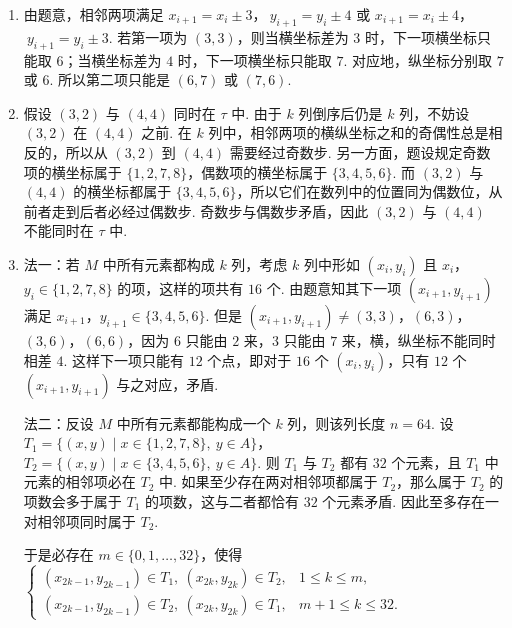 \documentclass[UTF8,a4paper,oneside,11pt]{ctexbook}
\begin{document}
\begin{solution}
\begin{enumerate}
\item 由题意，相邻两项满足
\(x_{i+1}=x_i\pm 3\)，\(\ y_{i+1}=y_i\pm 4\) 或 \(x_{i+1}=x_i\pm 4\)，\(\ y_{i+1}=y_i\pm 3\).
若第一项为 \((3,3)\)，则当横坐标差为 \(3\) 时，下一项横坐标只能取 \(6\)；当横坐标差为 \(4\) 时，下一项横坐标只能取 \(7\). 对应地，纵坐标分别取 \(7\) 或 \(6\). 所以第二项只能是
\((6,7)\) 或 \((7,6)\).

\item 假设 \((3,2)\) 与 \((4,4)\) 同时在 \(\tau\) 中. 由于 \(k\) 列倒序后仍是 \(k\) 列，不妨设 \((3,2)\) 在 \((4,4)\) 之前. 在 \(k\) 列中，相邻两项的横纵坐标之和的奇偶性总是相反的，所以从 \((3,2)\) 到 \((4,4)\) 需要经过奇数步. 另一方面，题设规定奇数项的横坐标属于 \(\{1,2,7,8\}\)，偶数项的横坐标属于 \(\{3,4,5,6\}\). 而 \((3,2)\) 与 \((4,4)\) 的横坐标都属于 \(\{3,4,5,6\}\)，所以它们在数列中的位置同为偶数位，从前者走到后者必经过偶数步. 奇数步与偶数步矛盾，因此 \((3,2)\) 与 \((4,4)\) 不能同时在 \(\tau\) 中.

\item 法一：若 \(M\) 中所有元素都构成 \(k\) 列，考虑 \(k\) 列中形如 \((x_i,y_i)\) 且 \(x_i\)，\(y_i\in\{1,2,7,8\}\) 的项，这样的项共有 \(16\) 个. 由题意知其下一项 \((x_{i+1},y_{i+1})\) 满足 \(x_{i+1}\)，\(y_{i+1}\in\{3,4,5,6\}\). 但是 \((x_{i+1},y_{i+1})\ne (3,3)\)，\((6,3)\)，\((3,6)\)，\((6,6)\)，因为 \(6\) 只能由 \(2\) 来，\(3\) 只能由 \(7\) 来，横，纵坐标不能同时相差 \(4\). 这样下一项只能有 \(12\) 个点，即对于 \(16\) 个 \((x_i,y_i)\)，只有 \(12\) 个 \((x_{i+1},y_{i+1})\) 与之对应，矛盾.

法二：反设 \(M\) 中所有元素都能构成一个 \(k\) 列，则该列长度 \(n=64\). 设 \(T_1=\{(x,y)\mid x\in\{1,2,7,8\},\ y\in A\}\)，\(T_2=\{(x,y)\mid x\in\{3,4,5,6\},\ y\in A\}\). 则 \(T_1\) 与 \(T_2\) 都有 \(32\) 个元素，且 \(T_1\) 中元素的相邻项必在 \(T_2\) 中. 如果至少存在两对相邻项都属于 \(T_2\)，那么属于 \(T_2\) 的项数会多于属于 \(T_1\) 的项数，这与二者都恰有 \(32\) 个元素矛盾. 因此至多存在一对相邻项同时属于 \(T_2\).

于是必存在 \(m\in\{0,1,\dots,32\}\)，使得
\(
\begin{cases}
(x_{2k-1},y_{2k-1})\in T_1,\ (x_{2k},y_{2k})\in T_2,& 1\le k\le m,\\
(x_{2k-1},y_{2k-1})\in T_2,\ (x_{2k},y_{2k})\in T_1,& m+1\le k\le 32.
\end{cases}
\)


\end{enumerate}
\end{solution}
\end{document}

